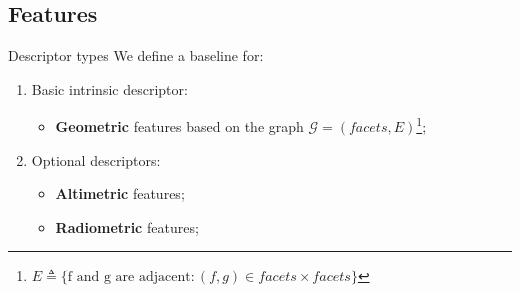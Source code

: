 \documentclass{beamer}
\begin{document}
        \subsection{Features}
            \begin{frame}{Descriptor types}
                We define a baseline for:
                \begin{enumerate}[label = (\roman*)., font=\color{black}]
                    \item<1-> Basic intrinsic descriptor:
                    \begin{itemize}[label=$\blacktriangleright$, font=\color{IGNGreen}]
                        \item<2-> \textbf{Geometric} features based on the graph $\mathscr{G}=(facets, E)$\footnote{$E \triangleq \{\text{f and g are adjacent}: (f, g) \in facets \times facets\}$};
                    \end{itemize}
                    \item<3-> Optional descriptors:
                    \begin{itemize}[label=$\blacktriangleright$, font=\color{blue}]
                        \item<4-> \textbf{Altimetric} features;
                        \item<5-> \textbf{Radiometric} features;
                    \end{itemize}
                \end{enumerate}
            \end{frame}
\end{document}
